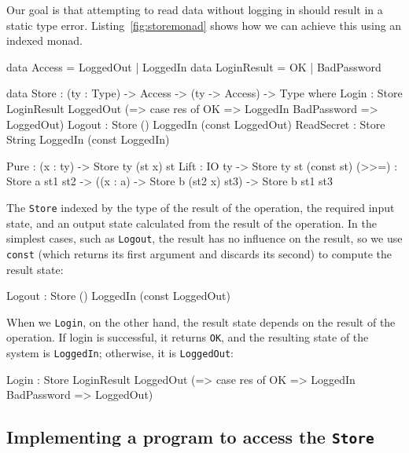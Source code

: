Our goal is that attempting to read data without logging in should result in a
static type error.  Listing~\ref{fig:storemonad} shows how we can achieve this
using an indexed monad.

\small
\begin{code}[float=h, frame=single,caption={Implementing the state store as
an indexed monad},label=fig:storemonad]
data Access = LoggedOut | LoggedIn
data LoginResult = OK | BadPassword

data Store : (ty : Type) -> Access -> (ty -> Access) -> Type where
     Login : Store LoginResult LoggedOut
                   (\res => case res of
                                 OK =>          LoggedIn
                                 BadPassword => LoggedOut)
     Logout :     Store ()     LoggedIn  (const LoggedOut)
     ReadSecret : Store String LoggedIn  (const LoggedIn)

     Pure : (x : ty) -> Store ty (st x) st
     Lift : IO ty -> Store ty st (const st)
     (>>=) : Store a st1 st2 -> ((x : a) -> Store b (st2 x) st3) -> Store b st1 st3
\end{code}
\normalsize

The \texttt{Store} indexed by the type of the result of the operation, the
required input state, and an output state calculated from the result of the
operation. In the simplest cases, such as \texttt{Logout}, the result has no
influence on the result, so we use \texttt{const} (which returns its first
argument and discards its second) to compute the result state:

\small
\begin{code}
Logout : Store () LoggedIn (const LoggedOut)
\end{code}
\normalsize

When we \texttt{Login}, on the other hand, the result state depends on the
result of the operation. If login is successful, it returns \texttt{OK},
and the resulting state of the system is \texttt{LoggedIn}; otherwise, it
is \texttt{LoggedOut}:

\small
\begin{code}
Login : Store LoginResult LoggedOut (\res => case res of
                                                  OK =>          LoggedIn
                                                  BadPassword => LoggedOut)
\end{code}
\normalsize

\subsection{Implementing a program to access the \texttt{Store}}

